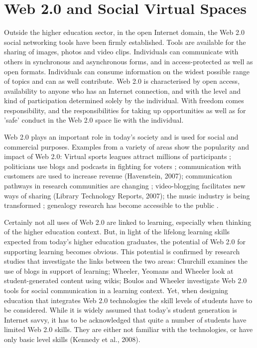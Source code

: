 \section{Web 2.0 and Social Virtual Spaces}
Outside the higher education sector, in the open Internet domain, the Web 2.0
social networking tools have been firmly established. Tools are available for
the sharing of images, photos and video clips. Individuals can communicate with
others in synchronous and asynchronous forms, and in access-protected as well as
open formats. Individuals can consume information on the widest possible range
of topics and can as well contribute. Web 2.0 is characterised by open access,
availability to anyone who has an Internet connection, and with the level and
kind of participation determined solely by the individual. With freedom comes
responsibility, and the responsibilities for taking up opportunities as well as
for 'safe' conduct in the Web 2.0 space lie with the individual.

Web 2.0 plays an important role in today's society and is used for social and
commercial purposes. Examples from a variety of areas show the popularity and
impact of Web 2.0: Virtual sports leagues attract millions of participants
\citep{Holahan2006}; politicians use blogs and podcasts in fighting for
voters \citep{Capell2006}; communication with customers are used to increase
revenue (Havenstein, 2007); communication pathways in research communities are
changing \citep{Ashling2007}; video-blogging facilitates new ways of sharing
(Library Technology Reports, 2007); the music industry is being transformed
\citep{Holahan2007}; genealogy research has become accessible to the public
\citep{MacMillan2007}.

Certainly not all uses of Web 2.0 are linked to learning, especially when
thinking of the higher education context. But, in light of the lifelong learning
skills expected from today’s higher education graduates, the potential of Web
2.0 for supporting learning becomes obvious. This potential is confirmed by
research studies that investigate the links between the two areas: Churchill
\citeyear{Churchill2009} examines the use of blogs in support of learning; Wheeler,
Yeomans and Wheeler \citeyear{Wheeler2008} look at student-generated content using
wikis; Boulos and Wheeler \citeyear{Boulos2007} investigate Web 2.0 tools for
social communication in a learning context. Yet, when designing education that
integrates Web 2.0 technologies the skill levels of students have to be
considered. While it is widely assumed that today’s student generation is
Internet savvy, it has to be acknowledged that quite a number of students have
limited Web 2.0 skills. They are either not familiar with the technologies, or
have only basic level skills (Kennedy et al., 2008).

